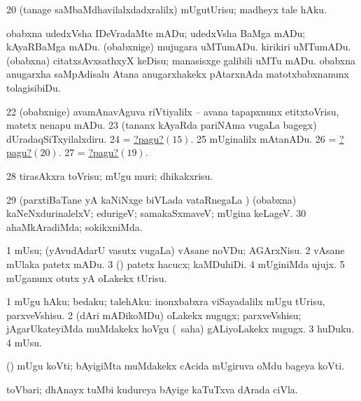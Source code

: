 \num{20} (tanage saMbaMdhavilalxdadxralilx) mUgutUrisu; madheyx tale hAku. 
  
\banum
{} obabxna udedxVsha IDeVradaMte mADu; udedxVsha BaMga mADu; kAyaRBaMga mADu. 
 (obabxnige) mujugara uMTumADu. kirikiri uMTumADu. 
 (obabxna) citatxsAvxsathxyX keDisu; manasisxge galibili uMTu mADu. 
 obabxna anugarxha saMpAdisalu Atana anugarxhakekx pAtarxnAda matotxbabxnanunx tolagisibiDu. 
\eanum
\numie
\num{22}  (obabxnige) avamAnavAguva riVtiyalilx -- avana tapapxnunx etitxtoVrisu, matetx nenapu mADu. 
\num{23}  (tananx kAyaRda pariNAma \mo vugaLa bagegx) dUradaqSiTxyilalxdiru. 
\num{24}  = \hyperlink{nose1 pagu15}{?pagu?\((15)\)}. 
\num{25}  mUginalilx mAtanADu. 
\num{26}  = \hyperlink{nose1 pagu20}{?pagu?\((20)\)}. 
\num{27}  = \hyperlink{nose1pagu19}{?pagu?\((19)\)}. 
\num{28}  tirasAkxra toVrisu; mUgu muri; dhikakxrisu. 
\num{29}  (parxtiBaTane yA kaNiNxge biVLada vataRnegaLa \vi) (obabxna) kaNeNxdurinalelxV; edurigeV; samakaSxmaveV; mUgina keLageV. 
\num{30}  ahaMkAradiMda; sokikxniMda. 
\enum
\emng
\eentry

\bentry
{}
\gl{\sakirx}
\bmng
\bnum
\num{1} mUsu; (yAvudAdarU vasutx \mo vugaLa) vAsane noVDu; AGArxNisu. 
\num{2} vAsane mUlaka patetx mADu. 
\num{3} (\rUpa) patetx hacucx; kaMDuhiDi. 
\num{4} mUginiMda ujujx. 
\num{5} mUganunx otutx yA oLakekx tUrisu. 
\enum
\emng

\noindent
\gl{\akirx}
\expl{}
\bmng
\bnum
\num{1} mUgu hAku; bedaku; talehAku:  inonxbabxra viSayadalilx mUgu tUrisu, parxveVshisu. 
\num{2} (dAri mADikoMDu) oLakekx nugugx; parxveVshisu; jAgarUkateyiMda muMdakekx hoVgu (\sakirx\ saha)  gALiyoLakekx nugugx. 
\num{3} huDuku. 
\num{4} mUsu. 
\enum
\emng
\eentry

\bentry
{}
\gl{\nA}
\bmng
(\pArxvi) mUgu koVti; bAyigiMta muMdakekx cAcida mUgiruva oMdu bageya koVti. 
\emng
\eentry

\bentry
{}
\gl{\nA}
\bmng
toVbari; dhAnayx tuMbi kudureya bAyige kaTuTxva dArada ciVla.  
\emng
\eentry

